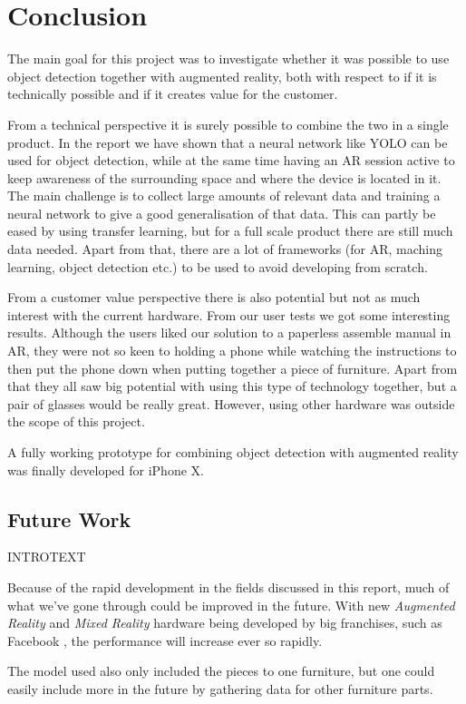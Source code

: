 \chapter{Conclusion}
The main goal for this project was to investigate whether it was possible to
use object detection together with augmented reality, both with respect to
if it is technically possible and if it creates value for the customer.

From a technical perspective it is surely possible to combine the two in a single
product. In the report we have shown that a neural network like
YOLO can be used for object detection, while at the same time having an AR 
session active to keep awareness of the surrounding space and where the device 
is located in it. The main challenge is to collect large amounts of relevant data and
training a neural network to give a good generalisation of that data. This can 
partly be eased by using transfer learning, but for a full scale product there are
still much data needed.
Apart from that, there are a lot of frameworks (for AR, maching learning, 
object detection etc.) to be used to avoid developing from scratch.

From a customer value perspective there is also potential but not as much
interest with the current hardware. From our user tests we got some interesting
results. Although the users liked our solution to a paperless assemble manual in
AR, they were not so keen to holding a phone while watching the instructions to
then put the phone down when putting together a piece of furniture.
Apart from that they all saw big potential with using this type of technology
together, but a pair of glasses would be really great. However, using other 
hardware was outside the scope of this project.

A fully working prototype for combining object detection with augmented reality
was finally developed for iPhone X.

\section{Future Work}
INTROTEXT

Because of the rapid development in the fields discussed in this report, much of what we've gone through could be improved in the future. With new \textit{Augmented Reality} and \textit{Mixed Reality} hardware being developed by big franchises, such as Facebook \cite{facebookAR}, the performance will increase ever so rapidly.

The model used also only included the pieces to one furniture, but one could easily include more in the future by gathering data for other furniture parts.

